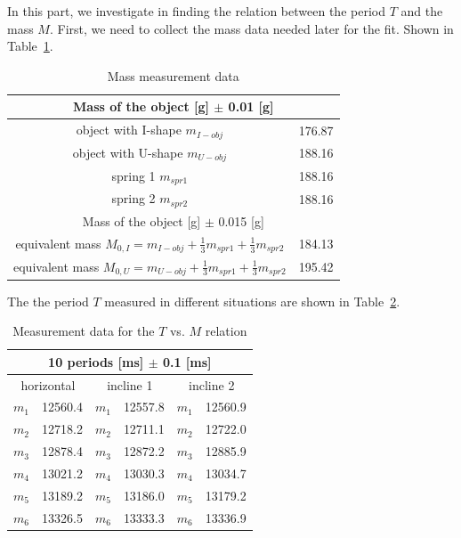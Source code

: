 In this part, we investigate in finding the relation between the period $T$ and 
the mass $M$.
First, we need to collect the mass data needed later for the fit. Shown in Table~\ref{dataMass}.

\begin{table}[H]
	\centering
	\begin{tabular}{|c|c|}
	\hline
	\multicolumn{2}{|c|}{Mass of the object [g] $\pm$ 0.01 [g]} \\ \hline
	object with I-shape $m_{I-obj}$  & 176.87 \\ \hline
	object with U-shape $m_{U-obj}$  & 188.16 \\ \hline
	spring 1 			$m_{spr1}$ & 188.16 \\ \hline
	spring 2 			$m_{spr2}$ & 188.16 \\ \hline \hline
	\multicolumn{2}{|c|}{Mass of the object [g] $\pm$ 0.015 [g]} \\ \hline 
	equivalent mass		$M_{0,I} = m_{I-obj} + \frac{1}{3} m_{spr1} + \frac{1}{3} m_{spr2} $ & 184.13 \\ \hline 
	equivalent mass		$M_{0,U} = m_{U-obj} + \frac{1}{3} m_{spr1} + \frac{1}{3} m_{spr2} $ & 195.42 \\ \hline 
	\end{tabular}
	\caption{Mass measurement data}
\label{dataMass}
\end{table}


The the period $T$ measured in different situations are shown in Table~\ref{dataTime}.

\begin{table}[H]
	\centering
	\begin{tabular}{|c|c||c|c||c|c|}
	\hline
	\multicolumn{6}{|c|}{10 periods [ms] $\pm$ 0.1 [ms]} \\ \hline
    \multicolumn{2}{|c||}{horizontal}  &
     \multicolumn{2}{|c||}{incline 1}  &
     \multicolumn{2}{|c|}{incline 2}  \\ \hline
	$m_1$ & 12560.4 & $m_1$ & 12557.8 & $m_1$ & 12560.9 \\ \hline
	$m_2$ & 12718.2 & $m_2$ & 12711.1 & $m_2$ & 12722.0 \\ \hline
	$m_3$ & 12878.4 & $m_3$ & 12872.2 & $m_3$ & 12885.9 \\ \hline
	$m_4$ & 13021.2 & $m_4$ & 13030.3 & $m_4$ & 13034.7 \\ \hline
	$m_5$ & 13189.2 & $m_5$ & 13186.0 & $m_5$ & 13179.2 \\ \hline
	$m_6$ & 13326.5 & $m_6$ & 13333.3 & $m_6$ & 13336.9 \\ \hline
	\end{tabular}
	\caption{Measurement data for the $T$ vs. $M$ relation}
\label{dataTime}
\end{table}


